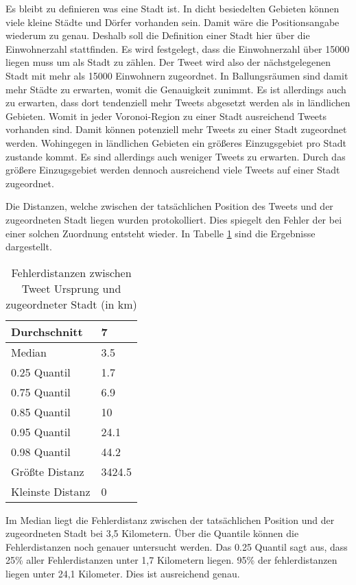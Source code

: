 			Es bleibt zu definieren was eine Stadt ist.
			In dicht besiedelten Gebieten können viele kleine Städte und Dörfer vorhanden sein. 
			Damit wäre die Positionsangabe wiederum zu genau.
			Deshalb soll die Definition einer Stadt hier über die Einwohnerzahl stattfinden.
			Es wird festgelegt, dass die Einwohnerzahl über 15000 liegen muss um als Stadt zu zählen. 
			Der Tweet wird also der nächstgelegenen Stadt mit mehr als 15000 Einwohnern zugeordnet.
			In Ballungsräumen sind damit mehr Städte zu erwarten, womit die Genauigkeit zunimmt.
			Es ist allerdings auch zu erwarten, dass dort tendenziell mehr Tweets abgesetzt werden als in ländlichen Gebieten.
			Womit in jeder Voronoi-Region zu einer Stadt ausreichend Tweets vorhanden sind.
			Damit können potenziell mehr Tweets zu einer Stadt zugeordnet werden.
			Wohingegen in ländlichen Gebieten ein größeres Einzugsgebiet pro Stadt zustande kommt.
			Es sind allerdings auch weniger Tweets zu erwarten. 
			Durch das größere Einzugsgebiet werden dennoch ausreichend viele Tweets auf einer Stadt zugeordnet. 

			Die Distanzen, welche zwischen der tatsächlichen Position des Tweets und der zugeordneten Stadt liegen wurden protokolliert. 
			Dies spiegelt den Fehler der bei einer solchen Zuordnung entsteht wieder.
			In Tabelle \ref{tab:distances} sind die Ergebnisse dargestellt.

			\begin{table}[h]
			\centering
			\caption{Fehlerdistanzen zwischen Tweet Ursprung und zugeordneter Stadt (in km)}
			\label{tab:distances}
			\begin{tabular}{|l|l|}
			Durchschnitt & 7      \\ \hline
			Median       & 3.5    \\ \hline
			0.25 Quantil & 1.7    \\ \hline
			0.75 Quantil & 6.9    \\ \hline
			0.85 Quantil & 10     \\ \hline
			0.95 Quantil & 24.1   \\ \hline
			0.98 Quantil & 44.2   \\ \hline
			Größte Distanz      & 3424.5 \\ \hline
			Kleinste Distanz     & 0     
			\end{tabular}
			\end{table}

			Im Median liegt die Fehlerdistanz zwischen der tatsächlichen Position und der zugeordneten Stadt bei 3,5 Kilometern.
			Über die Quantile können die Fehlerdistanzen noch genauer untersucht werden.
			Das 0.25 Quantil sagt aus, dass 25\% aller Fehlerdistanzen unter 1,7 Kilometern liegen.
			95\% der fehlerdistanzen liegen unter 24,1 Kilometer. 
			Dies ist ausreichend genau. 

